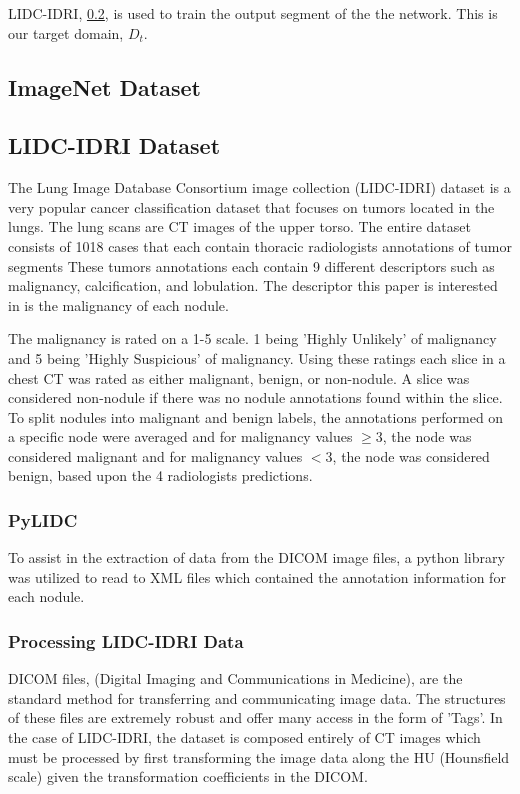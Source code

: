 \documentclass[10pt,twocolumn,letterpaper]{article}
\begin{document}
   LIDC-IDRI, \ref{sec:data-lidc}, is used to train the output segment of the
   the network. This is our target domain, $D_t$.

   \subsection{ImageNet Dataset} \label{sec:data-imagenet}


   \subsection{LIDC-IDRI Dataset} \label{sec:data-lidc}
      The Lung Image Database Consortium image collection (LIDC-IDRI) dataset
      is a very popular cancer classification dataset that focuses on tumors located
      in the lungs. The lung scans are CT images of the upper torso. The entire dataset
      consists of 1018 cases that each contain thoracic radiologists annotations of tumor segments
      These tumors annotations each contain 9 different descriptors such as malignancy,
      calcification, and lobulation. The descriptor this paper is interested in is the
      malignancy of each nodule.

      The malignancy is rated on a 1-5 scale. 1 being 'Highly Unlikely' of malignancy and
      5 being 'Highly Suspicious' of malignancy. Using these ratings each slice in a chest CT
      was rated as either malignant, benign, or non-nodule. A slice was considered non-nodule
      if there was no nodule annotations found within the slice. To split nodules into malignant
      and benign labels, the annotations performed on a specific node were averaged and for malignancy
      values $\ge 3$, the node was considered malignant and for malignancy values $< 3$, the node was
      considered benign, based upon the 4 radiologists predictions.
    
      \subsubsection{PyLIDC} \label{sec:data-lidc-pylidc}
         To assist in the extraction of data from the DICOM image files, a python library was utilized
         to read to XML files which contained the annotation information for each nodule. \cite{Hancock2018}
    
      \subsubsection{Processing LIDC-IDRI Data} \label{sec:data-lidc-processing}
         DICOM files, (Digital Imaging and Communications in Medicine), are the standard method for transferring
         and communicating image data. The structures of these files are extremely robust and offer many access in
         the form of 'Tags'. In the case of LIDC-IDRI, the dataset is composed entirely of CT images which must be
         processed by first transforming the image data along the HU (Hounsfield scale) given the transformation
         coefficients in the DICOM.
    
\end{document}
